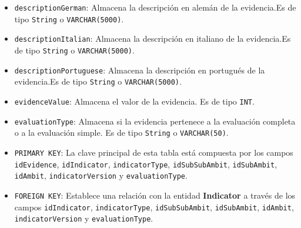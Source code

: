 \begin{itemize}
\begin{itemize}
        \item \texttt{descriptionGerman}: Almacena la descripción en alemán de la evidencia.Es de tipo \texttt{String} o \texttt{VARCHAR(5000)}.
        \item \texttt{descriptionItalian}: Almacena la descripción en italiano de la evidencia.Es de tipo \texttt{String} o \texttt{VARCHAR(5000)}.
        \item \texttt{descriptionPortuguese}: Almacena la descripción en portugués de la evidencia.Es de tipo \texttt{String} o \texttt{VARCHAR(5000)}.
        \item \texttt{evidenceValue}: Almacena el valor de la evidencia. Es de tipo \texttt{INT}.
        \item \texttt{evaluationType}: Almacena si la evidencia pertenece a la evaluación completa o a la evaluación simple. Es de tipo \texttt{String} o \texttt{VARCHAR(50)}.
        \item \texttt{PRIMARY KEY}: La clave principal de esta tabla está compuesta por los campos \texttt{idEvidence}, \texttt{idIndicator}, \texttt{indicatorType}, \texttt{idSubSubAmbit}, \texttt{idSubAmbit}, \texttt{idAmbit}, \texttt{indicatorVersion} y \texttt{evaluationType}.
        \item \texttt{FOREIGN KEY}: Establece una relación con la entidad \textbf{Indicator} a través de los campos \texttt{idIndicator}, \texttt{indicatorType}, \texttt{idSubSubAmbit}, \texttt{idSubAmbit}, \texttt{idAmbit}, \texttt{indicatorVersion} y \texttt{evaluationType}.
        \end{itemize}



\end{itemize}
